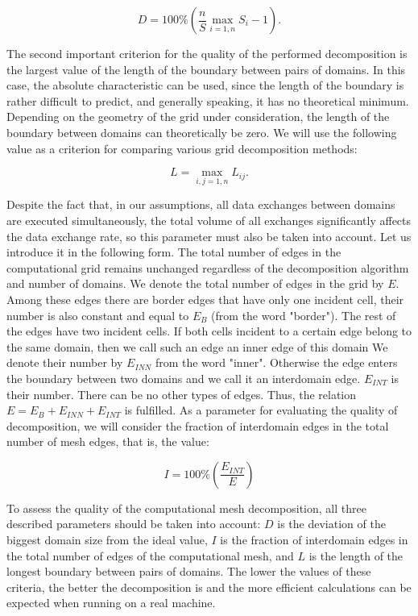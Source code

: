 \documentclass[
11pt,%
tightenlines,%
twoside,%
onecolumn,%
nofloats,%
nobibnotes,%
nofootinbib,%
superscriptaddress,%
noshowpacs,%
centertags]%
{revtex4}
\begin{document}
\begin{equation}
D = 100 \% \left( \frac{n}{S} \max_{i=1,n}{S_i} - 1 \right).
\end{equation}

The second important criterion for the quality of the performed decomposition is the largest value of the length of the boundary between pairs of domains.
In this case, the absolute characteristic can be used, since the length of the boundary is rather difficult to predict, and generally speaking, it has no theoretical minimum.
Depending on the geometry of the grid under consideration, the length of the boundary between domains can theoretically be zero.
We will use the following value as a criterion for comparing various grid decomposition methods:

\begin{equation}
L = \max_{i,j=1,n}{L_{ij}}.
\end{equation}

Despite the fact that, in our assumptions, all data exchanges between domains are executed simultaneously, the total volume of all exchanges significantly affects the data exchange rate, so this parameter must also be taken into account.
Let us introduce it in the following form.
The total number of edges in the computational grid remains unchanged regardless of the decomposition algorithm and number of domains.
We denote the total number of edges in the grid by $ E $.
Among these edges there are border edges that have only one incident cell, their number is also constant and equal to $ E_B $ (from the word "border").
The rest of the edges have two incident cells.
If both cells incident to a certain edge belong to the same domain, then we call such an edge an inner edge of this domain
We denote their number by $ E_{INN} $ from the word "inner".
Otherwise the edge enters the boundary between two domains and we call it an interdomain edge.
$ E_{INT} $ is their number.
There can be no other types of edges.
Thus, the relation $ E = E_B + E_{INN} + E_{INT} $ is fulfilled.
As a parameter for evaluating the quality of decomposition, we will consider the fraction of interdomain edges in the total number of mesh edges, that is, the value:

\begin{equation}
I = 100 \% \left( \frac{E_{INT}}{E} \right)
\end{equation}

To assess the quality of the computational mesh decomposition, all three described parameters should be taken into account: $ D $ is the deviation of the biggest domain size from the ideal value, $ I $ is the fraction of interdomain edges in the total number of edges of the computational mesh, and $ L $ is the length of the longest boundary between pairs of domains.
The lower the values of these criteria, the better the decomposition is and the more efficient calculations can be expected when running on a real machine.
\end{document}
